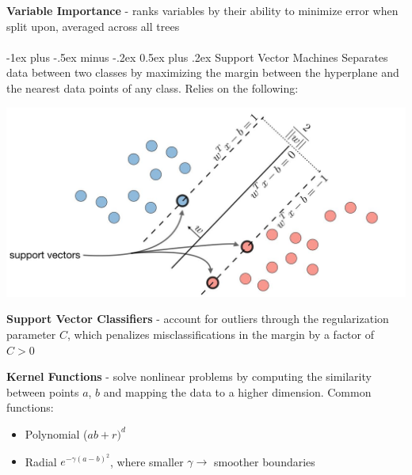 \documentclass[10pt,landscape]{article}
\makeatletter
\renewcommand{\section}{\@startsection{section}{1}{0mm}%
                                {-1ex plus -.5ex minus -.2ex}%
                                {0.5ex plus .2ex}%
                                {\normalfont\large\bfseries}}
\makeatother
\begin{document}
\begin{multicols}{3}
\textbf{Variable Importance} - ranks variables by their ability to minimize error when split upon, averaged across all trees
\columnbreak
\\\textcolor{white}{.}\vspace{-5mm}\\ %

\section{Support Vector Machines}
Separates data between two classes by maximizing the margin between the hyperplane and the nearest data points of any class. Relies on the following:
\vspace{-2.5mm}
\begin{center}
    \includegraphics[scale = .23]{images/svmNew2.JPG}
\end{center}
\vspace{-2mm}
\textbf{Support Vector Classifiers} - account for outliers through the regularization parameter $C$, which penalizes misclassifications in the margin by a factor of $C > 0$

\textbf{Kernel Functions} - solve nonlinear problems by computing the similarity between points $a$, $b$ and mapping the data to a higher dimension. Common functions:
\begin{itemize}[label={--},leftmargin=4mm]
\vspace{-1mm}
\itemsep -.4mm
\item Polynomial ($ab + r)^d$
\item Radial $e^{-\gamma(a-b)^2}$, where smaller $\gamma \to$  smoother boundaries
\end{itemize}


\end{multicols}
\end{document}
